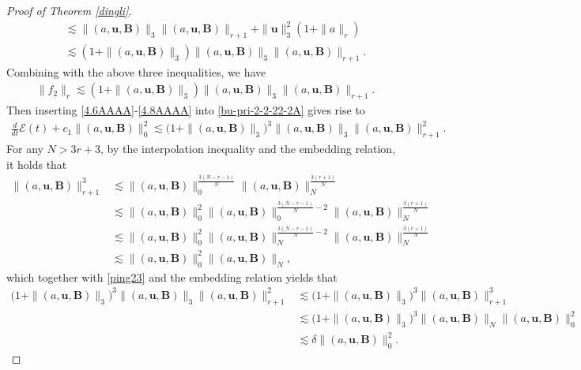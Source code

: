 \documentclass[10pt,a4paper]{amsart}
\def\b{ \mathbf{B} }
\def\u{ \mathbf{u} }
\begin{document}
\begin{proof}[Proof of Theorem \ref{dingli}]
\begin{equation*}
\begin{split}
&\quad\lesssim\|(a,\u,\b)\|_3\|(a,\u,\b)\|_{r+1}+\|\u\|_3^2(1+\|a\|_{r})
\\&\quad\lesssim (1+\|(a,\u,\b)\|_3)\|(a,\u,\b)\|_3\|(a,\u,\b)\|_{r+1}.%
\end{split}\end{equation*}
Combining  with the above three inequalities,  we have
\begin{equation}\begin{split}\label{4.8AAAA}
\|f_2\|_{r}\lesssim (1+\|(a,\u,\b)\|_3)\|(a,\u,\b)\|_3\|(a,\u,\b)\|_{r+1}.
\end{split}\end{equation}
Then inserting \eqref{4.6AAAA}-\eqref{4.8AAAA} into \eqref{bu-pri-2-2-22-2A} gives rise to
\begin{equation}\label{pri-2-2-22-2}
\begin{split}
\frac{d}{dt}{\mathcal{E}(t)}+c_1\|(a,\u,\b)\|_{0}^2\lesssim \big(1+\|(a,\u,\b)\|_3\big)^3\|(a,\u,\b)\|_3\|(a,\u,\b)\|^2_{r+1}.
\end{split}\end{equation}
For any ${N}>3r+3$, by the interpolation inequality and the embedding relation, it holds that
\begin{equation*}\begin{split}
\|(a,\u,\b)\|^3_{r+1}&\lesssim \|(a,\u,\b)\|_{0}^{\frac{3(N-r-1)}{N}}\|(a,\u,\b)\|_{N}^{\frac{3(r+1)}{N}}
\\&\lesssim\|(a,\u,\b)\|_{0}^{2}\|(a,\u,\b)\|_{0}^{\frac{3(N-r-1)}{N}-2}\|(a,\u,\b)\|_{N}^{\frac{3(r+1)}{N}}
\\&\lesssim\|(a,\u,\b)\|_{0}^{2}\|(a,\u,\b)\|_{N}^{\frac{3(N-r-1)}{N}-2}\|(a,\u,\b)\|_{N}^{\frac{3(r+1)}{N}}
\\&\lesssim\|(a,\u,\b)\|_{0}^{2}\|(a,\u,\b)\|_{N},
\end{split}\end{equation*}
which together with \eqref{ping23} and the embedding relation yields that
\begin{equation*}\label{pri-2-2-22-4}
\begin{split}\big(1+\|(a,\u,\b)\|_3\big)^3\|(a,\u,\b)\|_3\|(a,\u,\b)\|^2_{r+1}
&\lesssim \big(1+\|(a,\u,\b)\|_3\big)^3\|(a,\u,\b)\|^3_{r+1}
\\&\lesssim\big(1+\|(a,\u,\b)\|_3\big)^3\|(a,\u,\b)\|_{N}\|(a,\u,\b)\|_{0}^{2}
\\&\lesssim\delta\|(a,\u,\b)\|_{0}^{2}.
\end{split}\end{equation*}

\end{proof}
\end{document}
